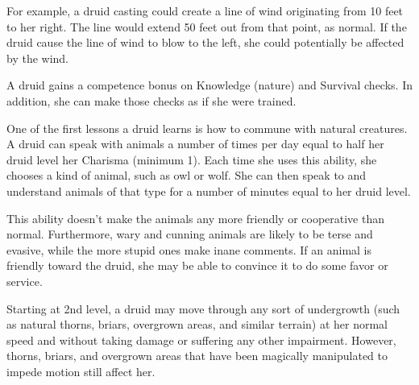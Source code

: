 For example, a druid casting  could create a line of wind originating from 10 feet to her right. The line would extend 50 feet out from that point, as normal. If the druid cause the line of wind to blow to the left, she could potentially be affected by the wind.

 A druid gains a  competence bonus on Knowledge (nature) and Survival checks. In addition, she can make those checks as if she were trained.

 One of the first lessons a druid learns is how to commune with natural creatures. A druid can speak with animals a number of times per day equal to half her druid level \add her Charisma (minimum 1). Each time she uses this ability, she chooses a kind of animal, such as owl or wolf. She can then speak to and understand animals of that type for a number of minutes equal to her druid level.

This ability doesn't make the animals any more friendly or cooperative than normal. Furthermore, wary and cunning animals are likely to be terse and evasive, while the more stupid ones make inane comments. If an animal is friendly toward the druid, she may be able to convince it to do some favor or service.

 Starting at 2nd level, a druid may move through any sort of undergrowth (such as natural thorns, briars, overgrown areas, and similar terrain) at her normal speed and without taking damage or suffering any other impairment. However, thorns, briars, and overgrown areas that have been magically manipulated to impede motion still affect her.

